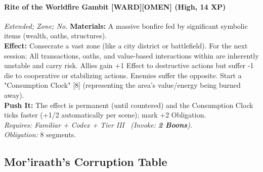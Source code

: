 \paragraph{Rite of the Worldfire Gambit \textnormal{[WARD][OMEN]} (High, 14 XP)} \emph{Extended; Zone; No.}
\textbf{Materials:} A massive bonfire fed by significant symbolic items (wealth, oaths, structures).\\
\textbf{Effect:} Consecrate a vast zone (like a city district or battlefield). For the next session: All transactions, oaths, and value-based interactions within are inherently unstable and carry risk. Allies gain +1 Effect to destructive actions but suffer -1 die to cooperative or stabilizing actions. Enemies suffer the opposite. Start a "Consumption Clock" [8] (representing the area's value/energy being burned away).\\
\textbf{Push It:} The effect is permanent (until countered) and the Consumption Clock ticks faster (+1/2 automatically per scene); mark +2 Obligation.\\
\emph{Requires: Familiar + Codex + Tier III \ (\textit{Invoke:} \textbf{2 Boons}).}\\
\emph{Obligation:} 8 segments.

\subsection*{Mor'iraath's Corruption Table}
\label{sec:moriraath-corruption}

